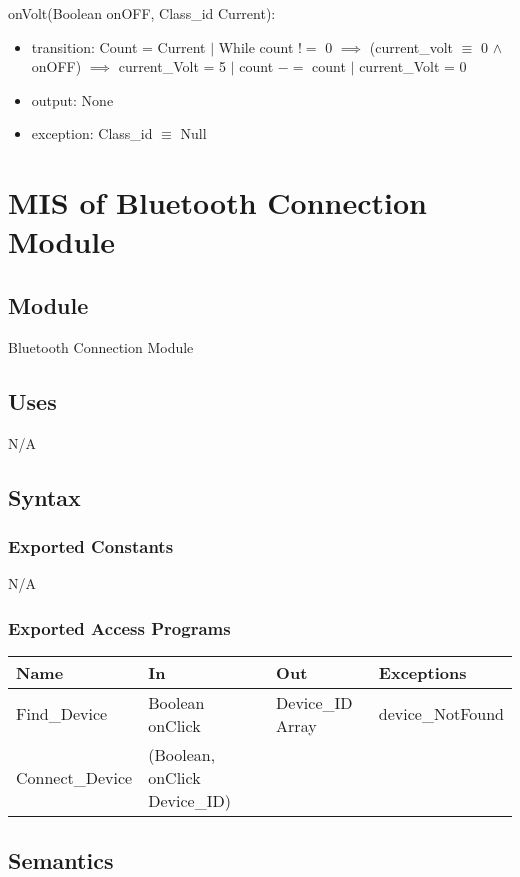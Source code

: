 \documentclass[12pt, titlepage]{article}
\begin{document}
\noindent onVolt(Boolean onOFF, Class\_id Current):
\begin{itemize}
\item transition: Count = Current $\vert$ While count $!=$ 0 $\implies$ (current\_volt $\equiv$ 0 $\land$ onOFF) $\implies$ current\_Volt = 5 $\vert$ count $-=$ count $\vert$ current\_Volt = 0  
\item output: None
\item exception: Class\_id $\equiv$ Null 
\end{itemize}

\newpage


\section{MIS of Bluetooth Connection Module} \label{Bluetooth Connection Module}
\subsection{Module}
Bluetooth Connection Module
\subsection{Uses}
N/A
\subsection{Syntax}

\subsubsection{Exported Constants}
N/A

\subsubsection{Exported Access Programs}

\begin{center}
\begin{tabular}{p{4cm} p{4cm} p{4cm} p{4cm}}
\hline
\textbf{Name} & \textbf{In} & \textbf{Out} & \textbf{Exceptions} \\
\hline
Find\_Device & Boolean onClick & Device\_ID Array & device\_NotFound\\
Connect\_Device & (Boolean, onClick Device\_ID) &  & \\
\hline
\end{tabular}
\end{center}

\subsection{Semantics}
\end{document}
